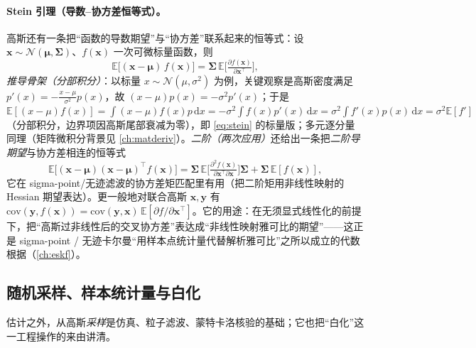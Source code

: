 \paragraph{Stein 引理（导数–协方差恒等式）。}
高斯还有一条把“函数的导数期望”与“协方差”联系起来的恒等式：设 $\mathbf{x}\sim\mathcal{N}(\boldsymbol{\mu},\boldsymbol{\Sigma})$、$f(\mathbf{x})$ 一次可微标量函数，则\cite{barfoot2024state}
\begin{equation}
  \mathbb{E}\big[(\mathbf{x}-\boldsymbol{\mu})\,f(\mathbf{x})\big]=\boldsymbol{\Sigma}\,\mathbb{E}\!\Big[\tfrac{\partial f(\mathbf{x})}{\partial\mathbf{x}^\top}\Big],
  \label{eq:stein}
\end{equation}
\emph{推导骨架（分部积分）}：以标量 $x\sim\mathcal{N}(\mu,\sigma^2)$ 为例，关键观察是高斯密度满足 $p'(x)=-\tfrac{x-\mu}{\sigma^2}p(x)$，故 $(x-\mu)p(x)=-\sigma^2 p'(x)$；于是 $\mathbb{E}[(x-\mu)f(x)]=\int(x-\mu)f(x)p\,\mathrm{d}x=-\sigma^2\int f(x)p'(x)\,\mathrm{d}x=\sigma^2\int f'(x)p(x)\,\mathrm{d}x=\sigma^2\mathbb{E}[f']$（分部积分，边界项因高斯尾部衰减为零），即 \cref{eq:stein} 的标量版；多元逐分量同理（矩阵微积分背景见 \cref{ch:matderiv}）。\emph{二阶（两次应用）}还给出一条把\emph{二阶导期望}与协方差相连的恒等式
\begin{equation}
  \mathbb{E}\big[(\mathbf{x}-\boldsymbol{\mu})(\mathbf{x}-\boldsymbol{\mu})^\top f(\mathbf{x})\big]
  =\boldsymbol{\Sigma}\,\mathbb{E}\!\Big[\tfrac{\partial^2 f(\mathbf{x})}{\partial\mathbf{x}^\top\partial\mathbf{x}}\Big]\boldsymbol{\Sigma}+\boldsymbol{\Sigma}\,\mathbb{E}[f(\mathbf{x})],
  \label{eq:stein-2nd}
\end{equation}
它在 sigma-point/无迹滤波的协方差矩匹配里有用（把二阶矩用非线性映射的 Hessian 期望表达）。更一般地对联合高斯 $\mathbf{x},\mathbf{y}$ 有 $\mathrm{cov}(\mathbf{y},f(\mathbf{x}))=\mathrm{cov}(\mathbf{y},\mathbf{x})\,\mathbb{E}[\partial f/\partial\mathbf{x}^\top]$。它的用途：在无须显式线性化的前提下，把“高斯过非线性后的交叉协方差”表达成“非线性映射雅可比的期望”——这正是 sigma-point / 无迹卡尔曼“用样本点统计量代替解析雅可比”之所以成立的代数根据（\cref{ch:eskf}）。

\subsection{随机采样、样本统计量与白化}
\label{sec:est-sampling}

估计之外，从高斯\emph{采样}是仿真、粒子滤波、蒙特卡洛核验的基础；它也把“白化”这一工程操作的来由讲清。

